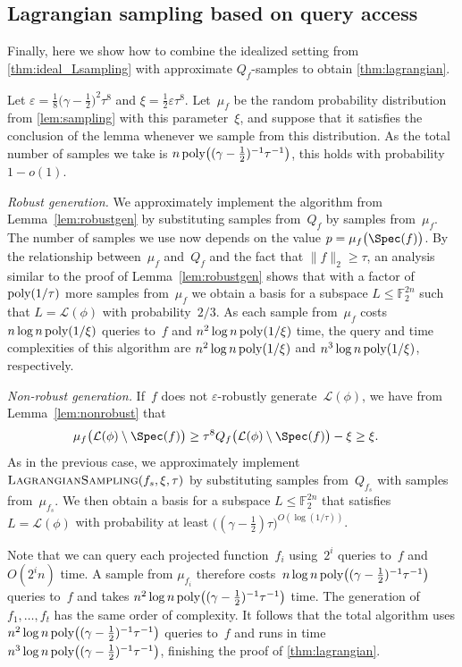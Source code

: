 \documentclass[11pt]{amsart}
\newcommand{\F}{\mathbb{F}} %
\newcommand{\eps}{\varepsilon}
\newcommand{\poly}{\mbox{\rm poly}}
\theoremstyle{plain}
\theoremstyle{definition}
\theoremstyle{remark}
\begin{document}
\subsection{Lagrangian sampling based on query access}

Finally, here we show how to combine the idealized setting from \cref{thm:ideal_Lsampling} with approximate $Q_f$-samples to obtain \cref{thm:lagrangian}.

Let $\eps = \frac{1}{8} \big(\gamma - \tfrac{1}{2}\big)^2\tau^8$ and $\xi = \frac{1}{2} \eps \tau^{8}$.
Let~$\mu_f$ be the random probability distribution from \cref{lem:sampling} with this parameter~$\xi$, and suppose that it satisfies the conclusion of the lemma whenever we sample from this distribution.
As the total number of samples we take is $n\, \poly\big((\gamma - \tfrac{1}{2})^{-1}\tau^{-1}\big)$, this holds with probability $1-o(1)$.

\emph{Robust generation.} 
We approximately implement the algorithm from Lemma~\ref{lem:robustgen} by substituting samples from~$Q_f$ by samples from~$\mu_f$. 
The number of samples we use now depends on the value $p = \mu_f\big(\Spec(f)\big)$.
By the relationship between~$\mu_f$ and~$Q_f$ and the fact that $\|f\|_2 \geq \tau$, an analysis similar to the proof of Lemma~\ref{lem:robustgen} shows that with a factor of $\poly(1/\tau)$ more samples from~$\mu_f$ we obtain a basis for a subspace $L\leq \F_2^{2n}$ such that $L = \mathcal L(\phi)$ with probability~$2/3$.
As each sample from~$\mu_f$ costs $n\log n\, \poly(1/\xi)$ queries to~$f$ and $n^2 \log n\, \poly(1/\xi)$ time, the query and time complexities of this algorithm are $n^2 \log n\,\poly(1/\xi)$ and $n^3\log n\,\poly(1/\xi)$, respectively.

\emph{Non-robust generation.}
If~$f$ does not $\eps$-robustly generate~$\mathcal L(\phi)$, we have from Lemma~\ref{lem:nonrobust} that
\begin{align*}
    \mu_f\big(\mathcal L(\phi)\setminus\Spec(f)\big) &\geq \tau^8 Q_f\big(\mathcal L(\phi)\setminus\Spec(f)\big) - \xi \geq \xi.
\end{align*}
As in the previous case, we approximately implement $\textsc{LagrangianSampling}(f_s, \xi, \tau)$ by substituting samples from~$Q_{f_s}$ with samples from~$\mu_{f_s}$.
We then obtain a basis for a subspace $L\leq \F_2^{2n}$ that satisfies~$L = \mathcal L(\phi)$ with probability at least $\big((\gamma - \tfrac{1}{2})\tau\big)^{O(\log(1/\tau))}$.

Note that we can query each projected function~$f_i$ using~$2^i$ queries to~$f$ and $O(2^in)$ time.
A sample from $\mu_{f_i}$ therefore costs~$n\log n\,\poly\big((\gamma - \tfrac{1}{2})^{-1} \tau^{-1}\big)$ queries to~$f$ and takes $n^2 \log n\, \poly\big((\gamma - \tfrac{1}{2})^{-1} \tau^{-1}\big)$ time.
The generation of~$f_1,\dots,f_t$ has the same order of complexity.
It follows that the total algorithm uses $n^2 \log n\, \poly\big((\gamma - \tfrac{1}{2})^{-1} \tau^{-1}\big)$ queries to~$f$ and runs in time $n^3 \log n\, \poly\big((\gamma - \tfrac{1}{2})^{-1} \tau^{-1}\big)$, finishing the proof of \cref{thm:lagrangian}.
\end{document}
